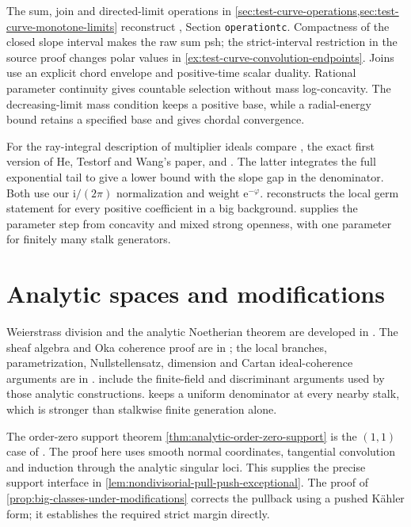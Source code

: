 The sum, join and directed-limit operations in \cref{sec:test-curve-operations,sec:test-curve-monotone-limits} reconstruct \cite{XiaSampleBook}, Section \texttt{operationtc}. Compactness of the closed slope interval makes the raw sum psh; the strict-interval restriction in the source proof changes polar values in \cref{ex:test-curve-convolution-endpoints}. Joins use an explicit chord envelope and positive-time scalar duality. Rational parameter continuity gives countable selection without mass log-concavity. The decreasing-limit mass condition keeps a positive base, while a radial-energy bound retains a specified base and gives chordal convergence.

For the ray-integral description of multiplier ideals compare \cite[Lemma 3.1, pp.~6--7]{HTW23}, the exact first version of He, Testorf and Wang's paper, and \cite[Theorem 2.4, pp.~10--11]{HTW2026v6}. The latter integrates the full exponential tail to give a lower bound with the slope gap in the denominator. Both use our $\mathrm i/(2\pi)$ normalization and weight $\mathrm e^{-\varphi}$.  reconstructs the local germ statement for every positive coefficient in a big background.  supplies the parameter step from concavity and mixed strong openness, with one parameter for finitely many stalk generators.

\section{Analytic spaces and modifications}\label{sec:history-analytic-spaces}
Weierstrass division and the analytic Noetherian theorem are developed in \cite[Chapter II, (2.3)--(2.7), pp.~80--81]{DemBook}. The sheaf algebra and Oka coherence proof are in \cite[Chapter II, (3.8)--(3.22), pp.~87--90]{DemBook}; the local branches, parametrization, Nullstellensatz, dimension and Cartan ideal-coherence arguments are in \cite[Chapter II, (4.1)--(4.31), pp.~91--100]{DemBook}.  include the finite-field and discriminant arguments used by those analytic constructions.  keeps a uniform denominator at every nearby stalk, which is stronger than stalkwise finite generation alone.

The order-zero support theorem \cref{thm:analytic-order-zero-support} is the $(1,1)$ case of \cite[Chapter III, (2.10)--(2.14), pp.~141--143]{DemBook}. The proof here uses smooth normal coordinates, tangential convolution and induction through the analytic singular loci. This supplies the precise support interface in \cref{lem:nondivisorial-pull-push-exceptional}. The proof of \cref{prop:big-classes-under-modifications} corrects the pullback using a pushed K\"ahler form; it establishes the required strict margin directly.

